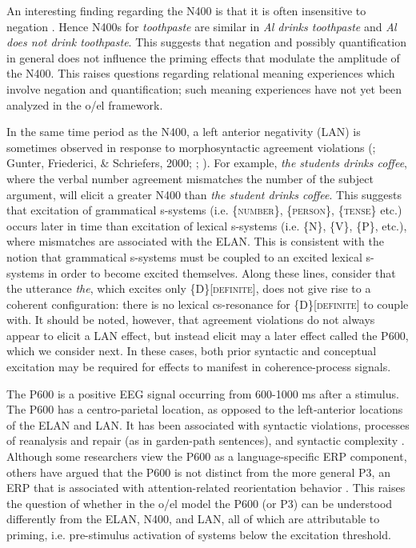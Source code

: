   An interesting finding regarding the N400 is that it is often insensitive to negation \citep{KutasFedermeier2011}. Hence N400s for \textit{toothpaste} are similar in \textit{Al drinks toothpaste} and \textit{Al does not drink toothpaste}. This suggests that negation and possibly quantification in general does not influence the priming effects that modulate the amplitude of the N400. This raises questions regarding relational meaning experiences which involve negation and quantification; such meaning experiences have not yet been analyzed in the o/el framework.

  In the same time period as the N400, a left anterior negativity (LAN) is sometimes observed in response to morphosyntactic agreement violations (\citealt{Friederici2002}; Gunter, Friederici, \& Schriefers, 2000; \citealt{KutasFedermeier2011}; \citealt{OsterhoutHolcomb1992}). For example, \textit{the students drinks coffee}, where the verbal number agreement mismatches the number of the subject argument, will elicit a greater N400 than \textit{the student drinks coffee}. This suggests that excitation of grammatical s-systems (i.e. \{\textsc{number}\}, \{\textsc{person}\}, \{\textsc{tense}\} etc.) occurs later in time than excitation of lexical s-systems (i.e. \{N\}, \{V\}, \{P\}, etc.), where mismatches are associated with the ELAN. This is consistent with the notion that grammatical s-systems must be coupled to an excited lexical s-systems in order to become excited themselves. Along these lines, consider that the utterance \textit{the}, which excites only \{D\}[\textsc{definite}], does not give rise to a coherent configuration: there is no lexical cs-resonance for \{D\}[\textsc{definite}] to couple with. It should be noted, however, that agreement violations do not always appear to elicit a LAN effect, but instead elicit may a later effect called the P600, which we consider next. In these cases, both prior syntactic and conceptual excitation may be required for effects to manifest in coherence-process signals.

  The P600 is a positive EEG signal occurring from 600-1000 ms after a stimulus. The P600 has a centro-parietal location, as opposed to the left-anterior locations of the ELAN and LAN. It has been associated with syntactic violations, processes of reanalysis and repair (as in garden-path sentences), and syntactic complexity \citep{Friederici2002}. Although some researchers view the P600 as a language-specific ERP component, others have argued that the P600 is not distinct from the more general P3, an ERP that is associated with attention-related reorientation behavior \citep{SassenhagenBornkessel-Schlesewsky2015}. This raises the question of whether in the o/el model the P600 (or P3) can be understood differently from the ELAN, N400, and LAN, all of which are attributable to priming, i.e. pre-stimulus activation of systems below the excitation threshold.

